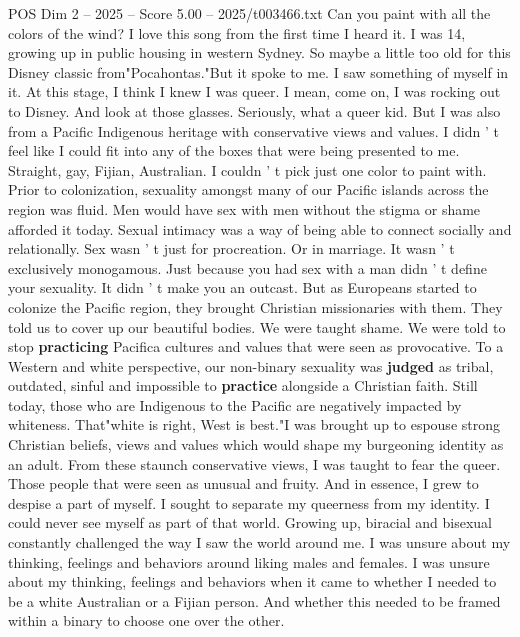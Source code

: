 \begin{textsample}{POS Dim 2 – 2025 – Score 5.00 – 2025/t003466.txt}  \label{ex:f2_pos_094}
Can you paint with all the colors of the wind?
I love this song from the first time I heard it.
I was 14, growing up in public housing in western Sydney.
So maybe a little too old for this Disney classic from"Pocahontas."But it spoke to me.
I saw something of myself in it.
At this stage, I think I knew I was queer.
I mean, come on, I was rocking out to Disney.
And look at those glasses.
Seriously, what a queer kid.
But I was also from a Pacific Indigenous heritage with conservative views and values.
I didn ' t feel like I could fit into any of the boxes that were being presented to me.
Straight, gay, Fijian, Australian.
I couldn ' t pick just one color to paint with.
Prior to colonization, sexuality amongst many of our Pacific islands across the region was fluid.
Men would have sex with men without the stigma or shame afforded it today.
Sexual intimacy was a way of being able to connect socially and relationally.
Sex wasn ' t just for procreation.
Or in marriage.
It wasn ' t exclusively monogamous.
Just because you had sex with a man didn ' t define your sexuality.
It didn ' t make you an outcast.
But as Europeans started to colonize the Pacific region, they brought Christian missionaries with them.
They told us to cover up our beautiful bodies.
We were taught shame.
We were told to stop \textbf{practicing} Pacifica cultures and values that were seen as provocative.
To a Western and white perspective, our non-binary sexuality was \textbf{judged} as tribal, outdated, sinful and impossible to \textbf{practice} alongside a Christian faith.
Still today, those who are Indigenous to the Pacific are negatively impacted by whiteness.
That"white is right, West is best."I was brought up to espouse strong Christian beliefs, views and values which would shape my burgeoning identity as an adult.
From these staunch conservative views, I was taught to fear the queer.
Those people that were seen as unusual and fruity.
And in essence, I grew to despise a part of myself.
I sought to separate my queerness from my identity.
I could never see myself as part of that world.
Growing up, biracial and bisexual constantly challenged the way I saw the world around me.
I was unsure about my thinking, feelings and behaviors around liking males and females.
I was unsure about my thinking, feelings and behaviors when it came to whether I needed to be a white Australian or a Fijian person.
And whether this needed to be framed within a binary to choose one over the other.

\end{textsample}
